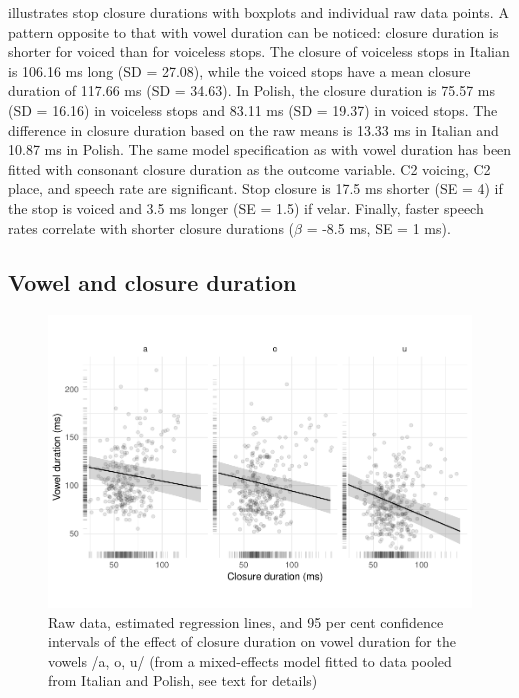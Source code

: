 \documentclass[charis]{glossa}
\begin{document}
 illustrates stop closure durations with boxplots and
individual raw data points. A pattern opposite to that with vowel
duration can be noticed: closure duration is shorter for voiced than for
voiceless stops. The closure of voiceless stops in Italian is 106.16 ms
long (SD = 27.08), while the voiced stops have a mean closure duration
of 117.66 ms (SD = 34.63). In Polish, the closure duration is 75.57 ms
(SD = 16.16) in voiceless stops and 83.11 ms (SD = 19.37) in voiced
stops. The difference in closure duration based on the raw means is
13.33 ms in Italian and 10.87 ms in Polish. The same model specification
as with vowel duration has been fitted with consonant closure duration
as the outcome variable. C2 voicing, C2 place, and speech rate are
significant. Stop closure is 17.5 ms shorter (SE = 4) if the stop is
voiced and 3.5 ms longer (SE = 1.5) if velar. Finally, faster speech
rates correlate with shorter closure durations (\(\hat{\beta}\) = -8.5
ms, SE = 1 ms).

\hypertarget{vowel-and-closure-duration}{%
\subsection{Vowel and closure
duration}\label{vowel-and-closure-duration}}

\label{s:vcduration}

\begin{figure}
\includegraphics[width=\linewidth]{2018-relrel_files/figure-latex/Figure4} \caption{Raw data, estimated regression lines, and 95 per cent confidence intervals of the effect of closure duration on vowel duration for the vowels /a, o, u/ (from a mixed-effects model fitted to data pooled from Italian and Polish, see text for details)}\label{f:Figure4}
\end{figure}
\end{document}
